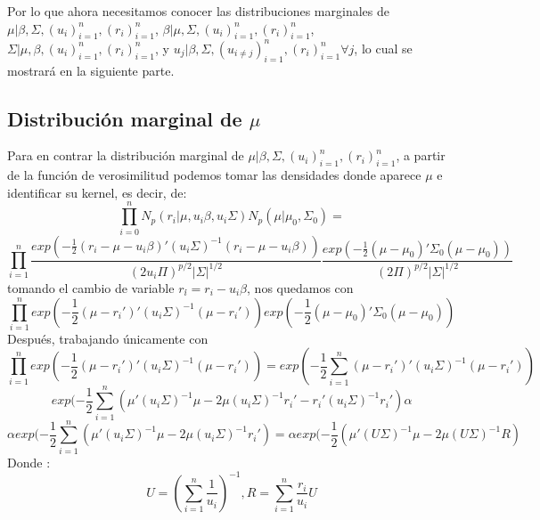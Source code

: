 \documentclass[11pt]{book}
\begin{document}
Por lo que ahora necesitamos conocer las distribuciones marginales de 
$\mu|\beta,\Sigma,(u_{i})_{i=1}^{n},(r_{i})_{i=1}^{n}$, $\beta|\mu,\Sigma,(u_{i})_{i=1}^{n},(r_{i})_{i=1}^{n}$, $\Sigma|\mu,\beta,(u_{i})_{i=1}^{n},(r_{i})_{i=1}^{n}$, y $u_{j}|\beta,\Sigma,(u_{i\ne  j})_{i=1}^{n},(r_{i})_{i=1}^{n} \forall j$, lo cual se mostrará en la siguiente parte.

\subsection*{Distribución marginal de $\mu$}
Para en contrar la distribución marginal de $\mu|\beta,\Sigma,(u_{i})_{i=1}^{n},(r_{i})_{i=1}^{n}$, a partir de la función de verosimilitud podemos tomar las densidades donde aparece $\mu$ e identificar su kernel, es decir, de: 
\begin{equation*}
\prod_{i=0}^{n}N_{p}(r_{i}|\mu,u_{i}\beta,u_{i}\Sigma)N_{p}(\mu|\mu_{0},\Sigma_{0})=
\end{equation*}
\begin{equation*}
\prod_{i=1}^{n}\dfrac{exp(-\frac{1}{2}(r_{i}-\mu-u_{i}\beta)'(u_{i}\Sigma)^{-1}(r_{i}-\mu-u_{i}\beta))}{(2u_{i}\Pi)^{p/2}|\Sigma|^{1/2}}\dfrac{exp(-\frac{1}{2}(\mu-\mu_{0})'\Sigma_{0}(\mu-\mu_{0}))}{(2\Pi)^{p/2}|\Sigma|^{1/2}}
\end{equation*}
tomando el cambio de variable  $r_{i}\acute{}=r_{i}-u_{i}\beta$, nos quedamos con 
\begin{equation*}
\prod_{i=1}^{n}exp(-\frac{1}{2}(\mu-r_{i}')'(u_{i}\Sigma)^{-1}(\mu-r_{i}'))exp(-\dfrac{1}{2}(\mu-\mu_{0})'\Sigma_{0}(\mu-\mu_{0}))
\end{equation*}
Después, trabajando únicamente con
\begin{equation*}
\prod_{i=1}^{n}exp(-\frac{1}{2}(\mu-r_{i}')'(u_{i}\Sigma)^{-1}(\mu-r_{i}'))=exp(-\frac{1}{2}\sum_{i=1}^{n}(\mu-r_{i}')'(u_{i}\Sigma)^{-1}(\mu-r_{i}'))
\end{equation*}
\begin{equation*}
exp(-\frac{1}{2}\sum_{i=1}^{n}(\mu'(u_{i}\Sigma)^{-1}\mu  -2\mu(u_{i}\Sigma)^{-1}r_{i}' -r_{i}'(u_{i}\Sigma)^{-1}r_{i}' )\alpha 
\end{equation*}
\begin{equation*}
\alpha exp(-\frac{1}{2}\sum_{i=1}^{n}(\mu'(u_{i}\Sigma)^{-1}\mu  -2\mu(u_{i}\Sigma)^{-1}r_{i}')=
\alpha exp(-\frac{1}{2}(\mu'(U\Sigma)^{-1}\mu  -2\mu(U\Sigma)^{-1}R)
\end{equation*}
Donde : 
\begin{equation*}
U=(\sum_{i=1}^{n}\dfrac{1}{u_{i}})^{-1}, R= \sum_{i=1}^{n}\dfrac{r_{i}}{u_{i}}U
\end{equation*}
\end{document}
